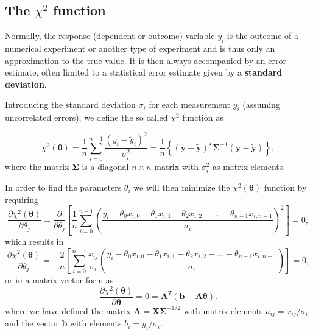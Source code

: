 \documentclass[%
oneside,                 %
final,                   %
10pt]{article}
\newenvironment{block_mdfboxadmon}[1][]{
\begin{block_mdfboxmdframed}[frametitle=#1]
}
{
\end{block_mdfboxmdframed}
}
\begin{document}
\subsection{The $\chi^2$ function}

\begin{block_mdfboxadmon}[]

Normally, the response (dependent or outcome) variable $y_i$ is the
outcome of a numerical experiment or another type of experiment and is
thus only an approximation to the true value. It is then always
accompanied by an error estimate, often limited to a statistical error
estimate given by a \textbf{standard deviation}. 

Introducing the standard deviation $\sigma_i$ for each measurement
$y_i$ (assuming uncorrelated errors), we define the so called $\chi^2$ function as

\[
\chi^2(\bm{\theta})=\frac{1}{n}\sum_{i=0}^{n-1}\frac{\left(y_i-\tilde{y}_i\right)^2}{\sigma_i^2}=\frac{1}{n}\left\{\left(\bm{y}-\bm{\tilde{y}}\right)^T \bm{\Sigma}^{-1}\left(\bm{y}-\bm{\tilde{y}}\right)\right\},
\]
where the matrix $\bm{\Sigma}$ is a diagonal $n \times n$ matrix with $\sigma_i^2$ as matrix elements.
\end{block_mdfboxadmon} %




\begin{block_mdfboxadmon}[]

In order to find the parameters $\theta_i$ we will then minimize the $\chi^2(\bm{\theta})$ function by requiring
\[
\frac{\partial \chi^2(\bm{\theta})}{\partial \theta_j} = \frac{\partial }{\partial \theta_j}\left[ \frac{1}{n}\sum_{i=0}^{n-1}\left(\frac{y_i-\theta_0x_{i,0}-\theta_1x_{i,1}-\theta_2x_{i,2}-\dots-\theta_{n-1}x_{i,n-1}}{\sigma_i}\right)^2\right]=0, 
\]
which results in
\[
\frac{\partial \chi^2(\bm{\theta})}{\partial \theta_j} = -\frac{2}{n}\left[ \sum_{i=0}^{n-1}\frac{x_{ij}}{\sigma_i}\left(\frac{y_i-\theta_0x_{i,0}-\theta_1x_{i,1}-\theta_2x_{i,2}-\dots-\theta_{n-1}x_{i,n-1}}{\sigma_i}\right)\right]=0, 
\]
or in a matrix-vector form as
\[
\frac{\partial \chi^2(\bm{\theta})}{\partial \bm{\theta}} = 0 = \bm{A}^T\left( \bm{b}-\bm{A}\bm{\theta}\right).  
\]
where we have defined the matrix $\bm{A} =\bm{X} \bm{\Sigma}^{-1/2}$ with matrix elements $a_{ij} = x_{ij}/\sigma_i$ and the vector $\bm{b}$ with elements $b_i = y_i/\sigma_i$.
\end{block_mdfboxadmon} %
\end{document}

